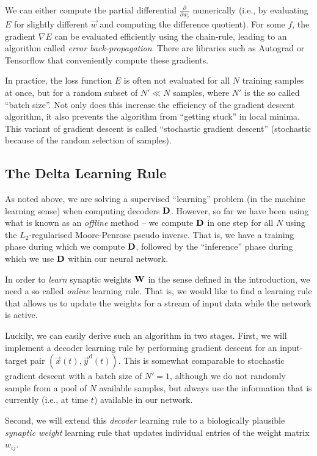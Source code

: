 \documentclass[10pt,letterpaper,oneside]{article}
\begin{document}
We can either compute the partial differential $\frac{\partial}{\partial w_i}$ numerically (i.e., by evaluating $E$ for slightly different $\vec w$ and computing the difference quotient). For some $f$, the gradient $\nabla E$ can be evaluated efficiently using the chain-rule, leading to an algorithm called \emph{error back-propagation}. There are libraries such as Autograd or Tensorflow that conveniently compute these gradients.

In practice, the loss function $E$ is often not evaluated for all $N$ training samples at once, but for a random subset of $N' \ll N$ samples, where $N'$ is the so called \enquote{batch size}. Not only does this increase the efficiency of the gradient descent algorithm, it also prevents the algorithm from \enquote{getting stuck} in local minima. This variant of gradient descent is called \enquote{stochastic gradient descent} (stochastic because of the random selection of samples).

\subsection{The Delta Learning Rule}

As noted above, we are solving a supervised \enquote{learning} problem (in the machine learning sense) when computing decoders ${\mathbf{D}}$. However, so far we have been using what is known as an \emph{offline} method -- we compute ${\mathbf{D}}$ in one step for all $N$ using the $L_2$-regularised Moore-Penrose pseudo inverse. That is, we have a training phase during which we compute ${\mathbf{D}}$, followed by the \enquote{inference} phase during which we use ${\mathbf{D}}$ within our neural network.

In order to \emph{learn} synaptic weights ${\mathbf{W}}$ in the sense defined in the introduction, we need a so called \emph{online} learning rule. That is, we would like to find a learning rule that allows us to update the weights for a stream of input data while the network is active.

Luckily, we can easily derive such an algorithm in two stages. First, we will implement a decoder learning rule by performing gradient descent for an input-target pair $(\vec x(t), \vec y^\mathrm{d}(t))$. This is somewhat comparable to stochastic gradient descent with a batch size of $N' = 1$, although we do not randomly sample from a pool of $N$ available samples, but always use the information that is currently (i.e., at time $t$) available in our network.

Second, we will extend this \emph{decoder} learning rule to a biologically plausible \emph{synaptic weight} learning rule that updates individual entries of the weight matrix $w_{ij}$.
\end{document}
